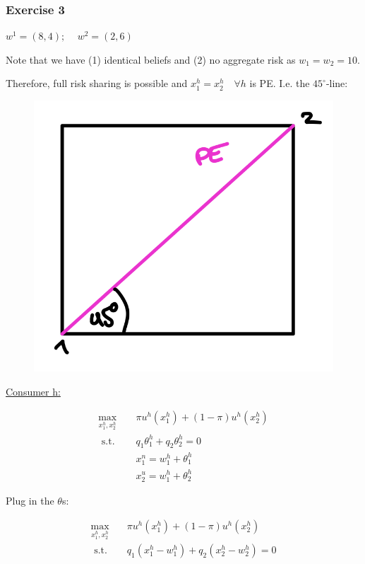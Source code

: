 {
\subsubsection*{Exercise 3}

$w^1=(8,4) \text {; } \quad w^2=(2,6)$

\begin{enumerate}[label=(\alph*)]
{\item 
Note that we have (1) identical beliefs
and (2) no aggregate risk as $w_{1}=w_{2}=10$.

Therefore, full risk sharing is possible and $x_{1}^{h}=x_{2}^{h} \quad \forall h$ is PE. I.e. the $45^{\circ}$-line:

\begin{figure}[!ht]
    \centering
    \includegraphics[width=.75\textwidth]{images/2014_15_3.png}
\end{figure}
}
{\item 
\underline{Consumer h:}

\begin{align*}
    \max_{x_{1}^{h}, x_{2}^{h}} \quad & \pi u^{h}\left(x_{1}^{h}\right)+(1-\pi) u^{h}\left(x_{2}^{h}\right) \\
    \text { s.t. } \quad & q_{1} \theta_{1}^{h}+q_{2} \theta_{2}^{h}=0 \\
    & x_{1}^{n}=w_{1}^{h}+\theta_{1}^{h} \\
    & x_{2}^{u}=w_{1}^{h}+\theta_{2}^{h}
\end{align*}

Plug in the $\theta$s:

\begin{align*}
    \max _{x_{1}^{h}, x_{2}^{h}} \quad & \pi u^{h}\left(x_{1}^{h}\right)+(1-\pi) u^{h}\left(x_{2}^{h}\right) \\
    \text { s.t. } & q_{1}\left(x_{1}^{h}-w_{1}^{h}\right)+q_{2}\left(x_{2}^{h}-w_{2}^{h}\right)=0
\end{align*}

}
\end{enumerate}}
